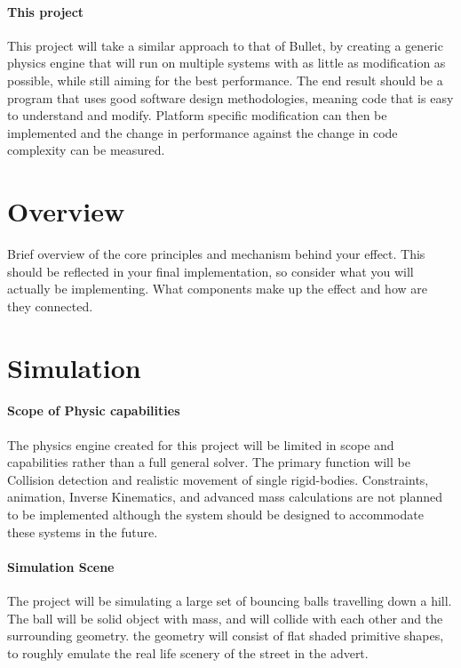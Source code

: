 \documentclass[conference]{acmsiggraph}
\begin{document}
\paragraph{This project}
This project will take a similar approach to that of Bullet, by creating a generic physics engine that will run on multiple systems with as little as modification as possible, while still aiming for the best performance. The end result should be a program that uses good software design methodologies, meaning code that is easy to understand and modify. Platform specific modification can then be implemented and the change in performance against the change in code complexity can be measured.

\section{Overview}
Brief overview of the core principles and mechanism behind your effect.  This should be reflected in your final implementation, so consider what you will actually be implementing. What components make up the effect and how are they connected.


\section{Simulation}

\paragraph{Scope of Physic capabilities}
The physics engine created for this project will be limited in scope and capabilities rather than a full general solver. The primary function will be Collision detection and realistic movement of single rigid-bodies. Constraints, animation, Inverse Kinematics, and advanced mass calculations are not planned to be implemented although the system should be designed to accommodate these systems in the future.

\paragraph{Simulation Scene}
The project will be simulating a large set of bouncing balls travelling down a hill. The ball will be solid object with mass, and will collide with each other and the surrounding geometry. the geometry will consist of flat shaded primitive shapes, to roughly emulate the real life scenery of the street in the advert.
\end{document}
